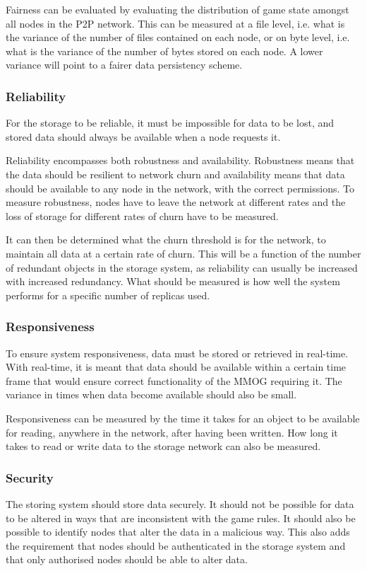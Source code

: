 \documentclass[10pt,a4paper,journal,cspaper,compsoc]{IEEEtran}
\begin{document}
Fairness can be evaluated by evaluating the distribution of game state amongst all nodes in the P2P network. This can be measured at a file level,
i.e. what is the variance of the number of files contained on each node, or on byte level, i.e. what is the variance of the number of bytes stored on
each node. A lower variance will point to a fairer data persistency scheme.

\subsubsection{Reliability}
For the storage to be reliable, it must be impossible for data to be lost, and stored data should always be available when a node requests it.

Reliability encompasses both robustness and availability. Robustness means that the data should be resilient to network churn and availability means
that data should be available to any node in the network, with the correct permissions. To measure robustness, nodes have to leave the network at
different rates and the loss of storage for different rates of churn have to be measured.

It can then be determined what the churn threshold is for the network, to maintain all data at a certain rate of churn. This will be a function of
the number of redundant objects in the storage system, as reliability can usually be increased with increased redundancy. What should be measured is
how well the system performs for a specific number of replicas used.

\subsubsection{Responsiveness}
To ensure system responsiveness, data must be stored or retrieved in real-time. With real-time, it is meant that data should be available within a
certain time frame that would ensure correct functionality of the MMOG requiring it. The variance in times when data become available should also be
small.

Responsiveness can be measured by the time it takes for an object to be available for reading, anywhere in the network, after having been written.
How long it takes to read or write data to the storage network can also be measured.

\subsubsection{Security}
The storing system should store data securely. It should not be possible for data to be altered in ways that are inconsistent with the game rules. It
should also be possible to identify nodes that alter the data in a malicious way. This also adds the requirement that nodes should be authenticated
in the storage system and that only authorised nodes should be able to alter data.
\end{document}
